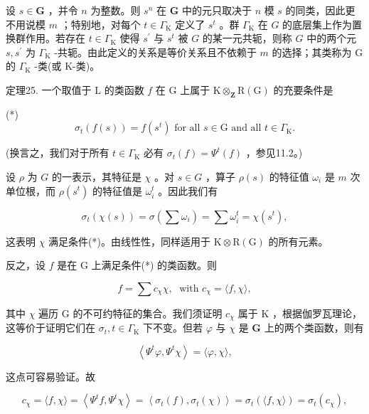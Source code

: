 \documentclass[10pt]{article}
\begin{document}
设 \(s \in  \mathbf{G}\) ，并令 \(n\) 为整数。则 \({s}^{n}\) 在 \(\mathbf{G}\) 中的元只取决于 \(n\) 模 \(s\) 的同类，因此更不用说模 \(m\) ；特别地，对每个 \(t \in  {\Gamma }_{\mathrm{K}}\) 定义了 \({s}^{t}\) 。群 \({\Gamma }_{\mathrm{K}}\) 在 \(G\) 的底层集上作为置换群作用。若存在 \(t \in  {\Gamma }_{\mathrm{K}}\) 使得 \({s}^{\prime }\) 与 \({s}^{t}\) 被 \(G\) 的某一元共轭，则称 \(G\) 中的两个元 \(s,{s}^{\prime }\) 为 \({\Gamma }_{\mathrm{K}}\) -共轭。由此定义的关系是等价关系且不依赖于 \(m\) 的选择；其类称为 G 的 \({\Gamma }_{\mathrm{K}}\) -类(或 K-类)。

定理25. 一个取值于 \(\mathrm{L}\) 的类函数 \(f\) 在 \(\mathrm{G}\) 上属于 \(\mathrm{K}{ \otimes  }_{\mathbf{Z}}\mathrm{R}\left( \mathrm{G}\right)\) 的充要条件是

(*)
\[
{\sigma }_{t}\left( {f\left( s\right) }\right)  = f\left( {s}^{t}\right) \text{ for all }s \in  \mathrm{G}\text{ and all }t \in  {\Gamma }_{\mathrm{K}}.
\]

(换言之，我们对于所有 \(t \in  {\Gamma }_{\mathrm{K}}\) 必有 \({\sigma }_{t}\left( f\right)  = {\Psi }^{t}\left( f\right)\) ，参见11.2。)

设 \(\rho\) 为 \(G\) 的一表示，其特征是 \(\chi\) 。对 \(s \in  G\) ，算子 \(\rho \left( s\right)\) 的特征值 \({\omega }_{i}\) 是 \(m\) 次单位根，而 \(\rho \left( {s}^{t}\right)\) 的特征值是 \({\omega }_{i}^{t}\) 。因此我们有

\[
{\sigma }_{t}\left( {\chi \left( s\right) }\right)  = \sigma \left( {\sum {\omega }_{i}}\right)  = \sum {\omega }_{i}^{t} = \chi \left( {s}^{t}\right) ,
\]

这表明 \(\chi\) 满足条件(*)。由线性性，同样适用于 \(\mathrm{K} \otimes  \mathrm{R}\left( \mathrm{G}\right)\) 的所有元素。

反之，设 \(f\) 是在 \(\mathrm{G}\) 上满足条件(*) 的类函数。则

\[
f = \sum {c}_{\chi }\chi ,\;\text{ with }{c}_{\chi } = \langle f,\chi \rangle ,
\]

其中 \(\chi\) 遍历 G 的不可约特征的集合。我们须证明 \({c}_{\chi }\) 属于 \(\mathrm{K}\) ，根据伽罗瓦理论，这等价于证明它们在 \({\sigma }_{t},t \in  {\Gamma }_{\mathrm{K}}\) 下不变。但若 \(\varphi\) 与 \(\chi\) 是 \(\mathbf{G}\) 上的两个类函数，则有

\[
\left\langle  {{\Psi }^{t}\varphi ,{\Psi }^{t}\chi }\right\rangle   = \langle \varphi ,\chi \rangle ,
\]

这点可容易验证。故

\[
{c}_{\chi } = \langle f,\chi \rangle  = \left\langle  {{\Psi }^{t}f,{\Psi }^{t}\chi }\right\rangle   = \left\langle  {{\sigma }_{t}\left( f\right) ,{\sigma }_{t}\left( \chi \right) }\right\rangle   = {\sigma }_{t}\left( {\langle f,\chi \rangle }\right)  = {\sigma }_{t}\left( {c}_{\chi }\right) ,
\]
\end{document}
